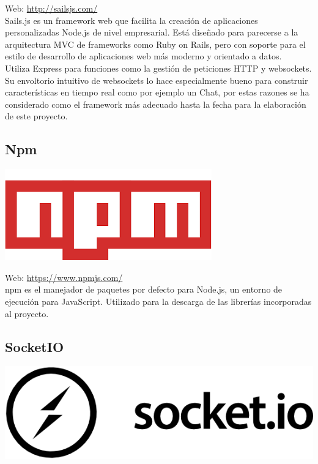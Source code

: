 Web: \url{http://sailsjs.com/}\\

Sails.js es un framework web que facilita la creación de aplicaciones personalizadas Node.js de nivel empresarial. Está diseñado para parecerse a la arquitectura MVC de frameworks como Ruby on Rails, pero con soporte para el estilo de desarrollo de aplicaciones web más moderno y orientado a datos.\\

Utiliza Express para funciones como la gestión de peticiones HTTP y websockets. Su envoltorio intuitivo de websockets lo hace especialmente bueno para construir características en tiempo real como por ejemplo un Chat, por estas razones se ha considerado como el framework más adecuado hasta la fecha para la elaboración de este proyecto.


\subsection{Npm}

\begin{center}
\includegraphics[scale=0.5]{imagenes/npm-logo.png}
\end{center}

Web: \url{https://www.npmjs.com/}\\

npm es el manejador de paquetes por defecto para Node.js, un entorno de ejecución para JavaScript. Utilizado para la descarga de las librerías incorporadas al proyecto.


\subsection{SocketIO}

\begin{center}
\includegraphics[scale=0.3]{imagenes/socketio-logo.png}
\end{center}

